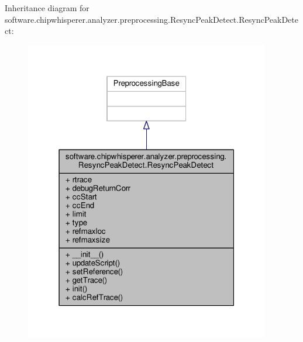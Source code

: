 Inheritance diagram for software.\+chipwhisperer.\+analyzer.\+preprocessing.\+Resync\+Peak\+Detect.\+Resync\+Peak\+Detect\+:\nopagebreak
\begin{figure}[H]
\begin{center}
\leavevmode
\includegraphics[width=304pt]{d3/dcb/classsoftware_1_1chipwhisperer_1_1analyzer_1_1preprocessing_1_1ResyncPeakDetect_1_1ResyncPeakDetect__inherit__graph}
\end{center}
\end{figure}



